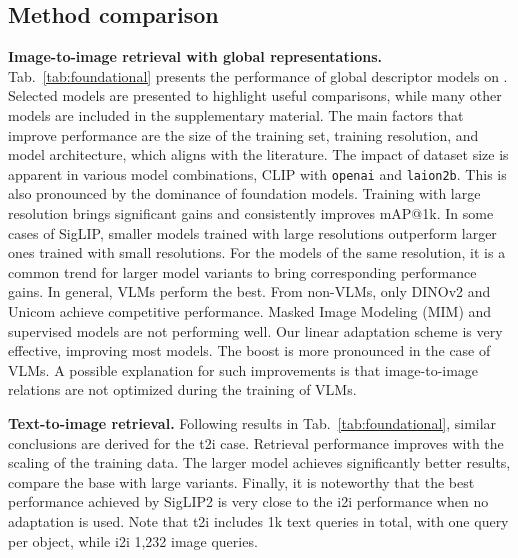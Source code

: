 \subsection{Method comparison}
\label{sec:methods_comparison}

\noindent\textbf{Image-to-image retrieval with global representations.}
Tab.~\ref{tab:foundational} presents the performance of global descriptor models on \ours. Selected models are presented to highlight useful comparisons, while many other models are included in the supplementary material. The main factors that improve performance are the size of the training set, training resolution, and model architecture, which aligns with the literature. The impact of dataset size is apparent in various model combinations, \eg CLIP with \texttt{openai} and \texttt{laion2b}. This is also pronounced by the dominance of foundation models. Training with large resolution brings significant gains and consistently improves mAP@1k. In some cases of SigLIP, smaller models trained with large resolutions outperform larger ones trained with small resolutions. For the models of the same resolution, it is a common trend for larger model variants to bring corresponding performance gains. 
In general, VLMs perform the best. From non-VLMs, only DINOv2 and Unicom achieve competitive performance. Masked Image Modeling (MIM) and supervised models are not performing well.
Our linear adaptation scheme is very effective, improving most models. The boost is more pronounced in the case of VLMs. A possible explanation for such improvements is that image-to-image relations are not optimized during the training of VLMs.

\noindent\textbf{Text-to-image retrieval.}
Following results in Tab.~\ref{tab:foundational}, similar conclusions are derived for the t2i case. Retrieval performance improves with the scaling of the training data. The larger model achieves significantly better results, \ie compare the base with large variants. Finally, it is noteworthy that the best performance achieved by SigLIP2 is very close to the i2i performance when no adaptation is used. Note that t2i includes 1k text queries in total, with one query per object, while i2i 1,232 image queries.

